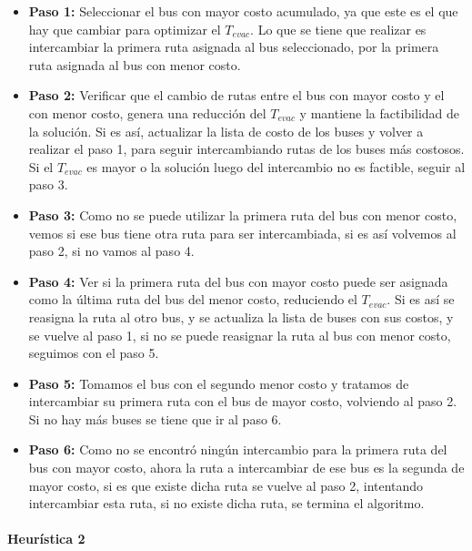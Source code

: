 \documentclass[letter, 10pt]{article}
\begin{document}
\begin{itemize}
\item \textbf{Paso 1:} Seleccionar el bus con mayor costo acumulado, ya que este es el que hay que cambiar para optimizar el $T_{evac}$. Lo que se tiene que realizar es intercambiar la primera ruta asignada al bus seleccionado, por la primera ruta asignada al bus con menor costo.

\item \textbf{Paso 2:}  Verificar que el cambio de rutas entre el bus con mayor costo y el con menor costo, genera una reducción del $T_{evac}$ y mantiene la factibilidad de la solución. Si es así, actualizar la lista de costo de los buses y volver a realizar el paso 1, para seguir intercambiando rutas de los buses más costosos. Si el $T_{evac}$ es mayor o la solución luego del intercambio no es factible, seguir al paso 3.

\item \textbf{Paso 3:} Como no se puede utilizar la primera ruta del bus con menor costo, vemos si ese bus tiene otra ruta para ser intercambiada, si es así volvemos al paso 2, si no vamos al paso 4.

\item \textbf{Paso 4:} Ver si la primera ruta del bus con mayor costo puede ser asignada como la última ruta del bus del menor costo, reduciendo el $T_{evac}$. Si es así se reasigna la ruta al otro bus, y se actualiza la lista de buses con sus costos, y se vuelve al paso 1, si no se puede reasignar la ruta al bus con menor costo, seguimos con el paso 5.

\item \textbf{Paso 5:} Tomamos el bus con el segundo menor costo y tratamos de intercambiar su primera ruta con el bus de mayor costo, volviendo al paso 2. Si no hay más buses se tiene que ir al paso 6.

\item \textbf{Paso 6:} Como no se encontró ningún intercambio para la primera ruta del bus con mayor costo, ahora la ruta a intercambiar de ese bus es la segunda de mayor costo, si es que existe dicha ruta se vuelve al paso 2, intentando intercambiar esta ruta, si no existe dicha ruta, se termina el algoritmo.
\end{itemize}

\paragraph{Heurística 2}
\end{document}
